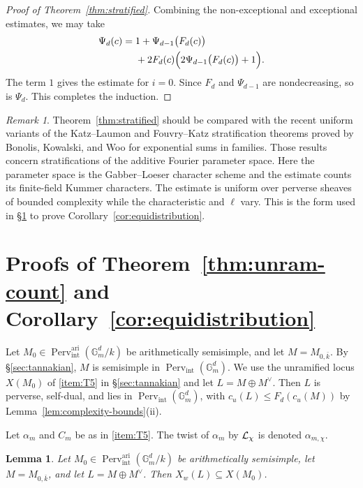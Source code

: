 \documentclass[12pt,reqno]{amsart}
\theoremstyle{definition}
\theoremstyle{plain}
\newtheorem{lem}[para]{Lemma}
\theoremstyle{definition}
\theoremstyle{remark}
\newtheorem{rem}[para]{Remark}
\newcommand{\bbG}{\mathbb{G}}  \newcommand{\bbH}{\mathbb{H}}
\newcommand{\Gm}{\bbG_m}
\newcommand{\Perv}{\operatorname{Perv}}
\newcommand{\cu}{c_u}
\begin{document}
\begin{proof}[Proof of Theorem~\ref{thm:stratified}]
Combining the non-exceptional and exceptional estimates, we may take
\[
\begin{aligned}
        \Psi_{d}(c)
        ={}&1+\Psi_{d-1}\bigl(F_{d}(c)\bigr)\\
        &+2F_{d}(c)
        \Bigl(2\Psi_{d-1}\bigl(F_{d}(c)\bigr)+1\Bigr).
\end{aligned}
\]
The term \(1\) gives the estimate for \(i=0\).  Since \(F_{d}\) and \(\Psi_{d-1}\) are nondecreasing,
so is \(\Psi_{d}\).  This completes the induction.
\end{proof}

\begin{rem}
Theorem~\ref{thm:stratified} should be compared with the recent uniform variants of the Katz--Laumon and
Fouvry--Katz stratification theorems proved by Bonolis, Kowalski, and Woo
\cite{BonolisKowalskiWoo2026} for exponential sums in families.  Those results concern stratifications
of the additive Fourier parameter space.  Here the parameter space is the Gabber--Loeser character
scheme and the estimate counts its finite-field Kummer characters.  The estimate is uniform over
perverse sheaves of bounded complexity while the characteristic and \(\ell\) vary.  This is the form used in
\S\ref{sec:unramified} to prove Corollary~\ref{cor:equidistribution}.
\end{rem}

\section{Proofs of Theorem~\ref{thm:unram-count} and Corollary~\ref{cor:equidistribution}}
\label{sec:unramified}

Let \(M_0\in\Perv_{\mathrm{int}}^{\mathrm{ari}}(\Gm^d/k)\) be arithmetically semisimple, and let
\(M=M_{0,\bar k}\).  By \S\ref{sec:tannakian}, \(M\) is semisimple in
\(\Perv_{\mathrm{int}}(\Gm^d)\).  We use the unramified locus \(X(M_0)\) of \ref{item:T5} in
\S\ref{sec:tannakian} and let \(L=M\oplus M^\vee\).  Then
\(L\) is perverse, self-dual, and lies in \(\Perv_{\mathrm{int}}(\Gm^d)\), with
\(\cu(L)\le F_{d}(\cu(M))\) by Lemma~\ref{lem:complexity-bounds}(ii).

Let \(\alpha_m\) and \(C_m\) be as in \ref{item:T5}.  The twist of \(\alpha_m\) by \(\mathcal{L}_\chi\) is
denoted \(\alpha_{m,\chi}\).

\begin{lem}
\label{lem:weakly-unramified-inclusion}
Let \(M_0\in\Perv_{\mathrm{int}}^{\mathrm{ari}}(\Gm^d/k)\) be arithmetically semisimple, let
\(M=M_{0,\bar k}\), and let \(L=M\oplus M^\vee\).  Then \(X_w(L)\subseteq X(M_0)\).
\end{lem}
\end{document}
